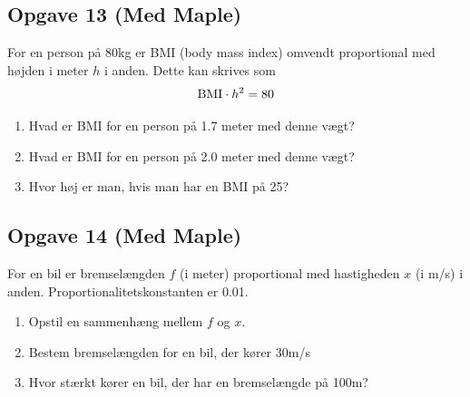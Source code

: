 \subsection*{Opgave 13 (Med Maple)}
For en person på 80kg er BMI (body mass index) omvendt proportional med højden i meter $h$ i anden. Dette kan skrives som
\begin{align*}
	\textnormal{BMI} \cdot h^2 = 80
\end{align*}
\begin{enumerate}[label=\roman*)]
	\item Hvad er BMI for en person på 1.7 meter med denne vægt?
	\item Hvad er BMI for en person på 2.0 meter med denne vægt?
	\item Hvor høj er man, hvis man har en BMI på 25?
\end{enumerate}

\subsection*{Opgave 14 (Med Maple)}
For en bil er bremselængden $f$ (i meter) proportional med hastigheden $x$ (i m/s) i anden. Proportionalitetskonstanten er 0.01.

\begin{enumerate}[label=\roman*)]
	\item Opstil en sammenhæng mellem $f$ og $x$.
	\item Bestem bremselængden for en bil, der kører 30m/s
	\item Hvor stærkt kører en bil, der har en bremselængde på 100m?
\end{enumerate}
